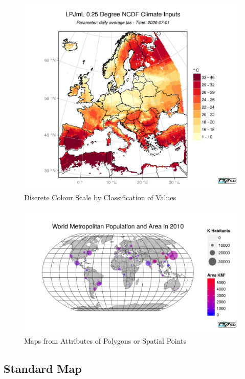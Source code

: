 \documentclass[a4paper,10pt]{article}
\begin{document}
\begin{figure}
  \centering
    \includegraphics[width=1\textwidth]{std_discrete}
    \caption{Discrete Colour Scale by Classification of Values}
  \label{fig:discrete}
\end{figure}



\begin{figure}
  \centering
    \includegraphics[width=1\textwidth]{point_pj}
  \caption{Maps from Attributes of Polygons or Spatial Points}
  \label{fig:point_prj}
\end{figure}





\subsection{Standard Map}
\end{document}

